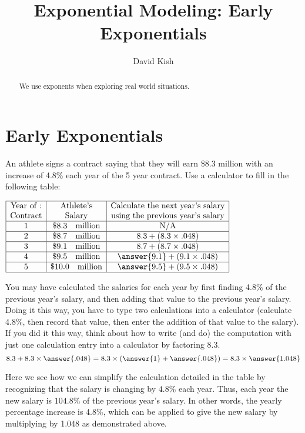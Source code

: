 \documentclass{ximera}
\author{David Kish}
\title{Exponential Modeling: Early Exponentials}
\begin{document}
\begin{abstract}
We use exponents when exploring real world situations.
\end{abstract}
\maketitle

 
\section{Early Exponentials}
\begin{example}
An athlete signs a contract saying that they will earn \$8.3 million with an increase of 4.8\% each year of the 5 year contract.
Use a calculator to fill in the following table:\\
\begin{center}
$\begin{array}{|c|c|c|}
\hline
\text{Year of :} & \text{Athlete's} & \text{Calculate the next year's salary} \\
\text{Contract} & \text{Salary} & \text{using the previous year's salary}\\
\hline
1& \$8.3 \quad \text{million} & \text{N/A} \\
\hline
2 & \$ 8.7 \quad \text{million} & 8.3 + (8.3 \times {.048})\\
\hline
3 & \$ {9.1} \quad \text{million} & 8.7 + (8.7 \times {.048}) \\
\hline
4 & \$ {9.5} \quad \text{million} & \answer{9.1} + ({9.1} \times {.048}) \\
\hline
5 & \$ {10.0} \quad \text{million} & \answer{9.5} + ({9.5} \times {.048})\\
\hline
\end{array}$
\end{center}
You may have calculated the salaries for each year by first finding 4.8\% of the previous year's salary, and then adding that value to the previous year's salary.  Doing it this way, you have to type two calculations into a calculator (calculate 4.8\%, then record that value, then enter the addition of that value to the salary).  If you did it this way, think about how to write (and do) the computation with just one calculation entry into a calculator by factoring $8.3$.
$$
8.3 + 8.3 \times \answer{.048} = 8.3 \times (\answer{1} + \answer{.048}) = 8.3 \times \answer{1.048}
$$
\end{example}
%
Here we see how we can simplify the calculation detailed in the table by recognizing that the salary is changing by $4.8\%$ each year. Thus, each year the new salary is $104.8\%$ of the previous year's salary. In other words, the yearly percentage increase is 4.8\%, which can be applied to give the new salary by multiplying by 1.048 as demonstrated above. 
\end{document}
